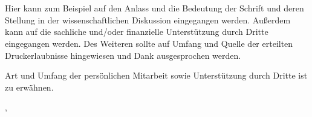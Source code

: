 \section*{\preamblename}\label{sec:\preamblename}


Hier kann zum Beispiel auf den Anlass und die Bedeutung der Schrift und deren Stellung in der wissenschaftlichen Diskussion eingegangen werden.
Außerdem kann auf die sachliche und/oder finanzielle Unterstützung durch Dritte eingegangen werden.
Des Weiteren sollte auf Umfang und Quelle der erteilten Druckerlaubnisse hingewiesen und Dank ausgesprochen werden.

Art und Umfang der persönlichen Mitarbeit sowie Unterstützung durch Dritte ist zu erwähnen.


\vspace{0.5cm}
\begingroup
\raggedright{\preamblelocation, \preambledate}
\hfill
\raggedleft{\textit{\thesisauthor}}
\endgroup